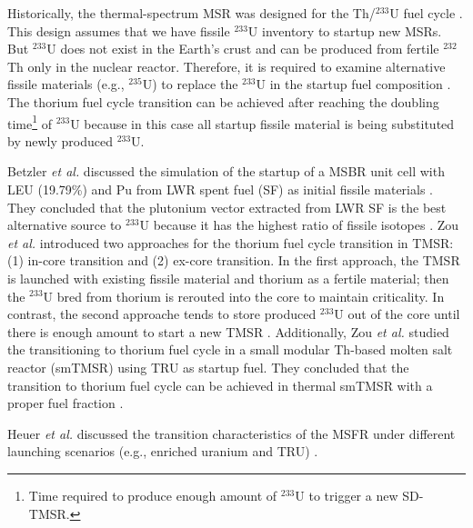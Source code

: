 Historically, the thermal-spectrum \gls{MSR} was designed for the Th/$^{233}$U
fuel cycle \cite{rykhlevskii2019modeling,nuttin2005potential,
merle2004scenarios,rosenthal1970molten}. This design assumes that we have
fissile $^{233}$U inventory to startup new \glspl{MSR}. But $^{233}$U does not
exist in the Earth's crust and can be produced from fertile $^{232}$Th only in
the nuclear reactor. Therefore, it is required to examine alternative fissile
materials (e.g., $^{235}$U) to replace the $^{233}$U in the startup fuel
composition \cite{betzler2016modeling,zou2018transition}. The thorium fuel
cycle transition can be achieved after reaching the doubling
time\footnote{Time required to produce enough amount of $^{233}$U to trigger a
new SD-TMSR.} of $^{233}$U because in this case all startup fissile material
is being substituted by newly produced $^{233}$U.

Betzler \emph{et al.} discussed the simulation of the startup of a MSBR unit
cell with \gls{LEU} (19.79\%) and Pu from \gls{LWR} spent fuel (SF) as initial
fissile materials \cite{betzler2016modeling}. They concluded that the 
plutonium vector extracted from LWR SF is the best alternative source to 
$^{233}$U because it has the highest ratio of fissile isotopes
\cite{betzler2016modeling}. Zou \emph{et al.} introduced two approaches for
the thorium fuel cycle transition in \gls{TMSR}: (1) in-core transition and 
(2) ex-core transition. In the first approach, the TMSR is launched with 
existing fissile material and thorium as a fertile material; then the 
$^{233}$U bred from thorium is rerouted into the core to maintain criticality. 
In contrast, the second approache tends to store produced $^{233}$U out of the 
core until there is enough amount to start a new TMSR \cite{zou2018transition}.
Additionally, Zou \emph{et al.} studied the transitioning to thorium fuel
cycle in a small modular Th-based molten salt reactor (smTMSR) using \gls{TRU}
as startup fuel. They concluded that the transition to thorium fuel cycle can
be achieved in thermal smTMSR with a proper fuel fraction 
\cite{zou2018preliminary}.

Heuer \emph{et al.} discussed the transition characteristics of the \gls{MSFR}
under different launching scenarios (e.g., enriched uranium and TRU)
\cite{heuer2014towards}.

